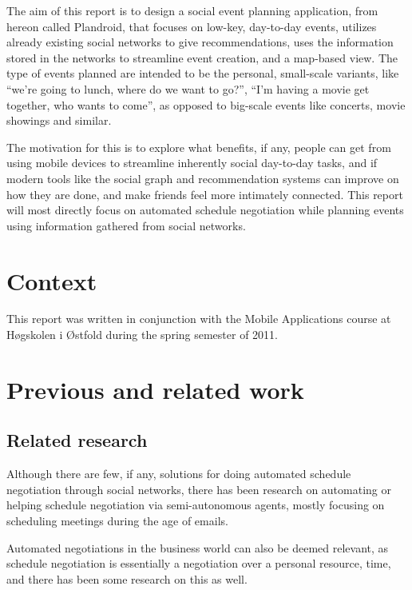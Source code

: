 \documentclass[a4paper,11pt]{report}
\begin{document}
The aim of this report is to design a social event planning application, from
hereon called Plandroid, that focuses on low-key, day-to-day events, utilizes
already existing social networks to give recommendations, uses the information
stored in the networks to streamline event creation, and a map-based view. The
type of events planned are intended to be the personal, small-scale variants,
like ``we're going to lunch, where do we want to go?'', ``I'm having a movie get
together, who wants to come'', as opposed to big-scale events like concerts,
movie showings and similar.

The motivation for this is to explore what benefits, if any, people can get from
using mobile devices to streamline inherently social day-to-day tasks, and if
modern tools like the social graph and recommendation systems can improve on how
they are done, and make friends feel more intimately connected. This report will
most directly focus on automated schedule negotiation while planning events
using information gathered from social networks.

\section{Context}
This report was written in conjunction with the Mobile Applications course at
H\o{}gskolen i \O{}stfold\cite{site:mobapp} during the spring semester of 2011.

\section{Previous and related work}

\subsection{Related research}

Although there are few, if any, solutions for doing automated schedule
negotiation through social networks, there has been research on automating or
helping schedule negotiation via semi-autonomous
agents\cite{haynes97:_autom_meetin_sched_system,sen97:_devel,benhassine07},
mostly focusing on scheduling meetings during the age of emails.

Automated negotiations in the business world can also be deemed relevant, as
schedule negotiation is essentially a negotiation over a personal resource,
time, and there has been some research on this as
well\cite{Beam97automatednegotiations:}.
\end{document}
